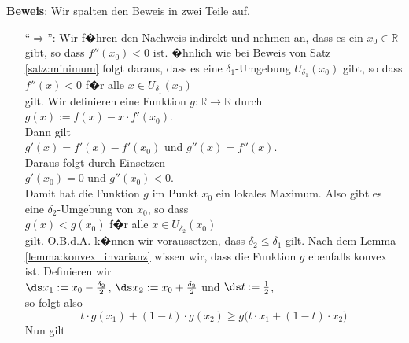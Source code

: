 \noindent
\textbf{Beweis}: Wir spalten den Beweis in zwei Teile auf.
\begin{enumerate}
\item[``$\Rightarrow$'':] Wir f�hren den Nachweis indirekt und nehmen an, dass es ein $x_0 \in \mathbb{R}$
  gibt, so dass $f''(x_0) < 0$ ist.  �hnlich wie bei Beweis von Satz \ref{satz:minimum} folgt daraus, dass
  es eine $\delta_1$-Umgebung $U_{\delta_1}(x_0)$ gibt, so dass
  \\[0.2cm]
  \hspace*{1.3cm} $f''(x) < 0$ \quad f�r alle $x \in U_{\delta_1}(x_0)$ 
  \\[0.2cm]
  gilt.  Wir definieren eine Funktion $g:\mathbb{R} \rightarrow \mathbb{R}$ durch
  \\[0.2cm]
  \hspace*{1.3cm}
  $g(x) := f(x) - x \cdot f'(x_0)$.
  \\[0.2cm]
  Dann gilt 
  \\[0.2cm]
  \hspace*{1.3cm}
  $g'(x) = f'(x) - f'(x_0)$ \quad und \quad $g''(x) = f''(x)$.
  \\[0.2cm]
  Daraus folgt durch Einsetzen
  \\[0.2cm]
  \hspace*{1.3cm}
  $g'(x_0) = 0$ \quad und \quad $g''(x_0) < 0$.
  \\[0.2cm]
  Damit hat die Funktion $g$ im Punkt $x_0$ ein lokales Maximum.  Also gibt es eine $\delta_2$-Umgebung von
  $x_0$, so dass
  \\[0.2cm]
  \hspace*{1.3cm}
  $g(x) < g(x_0)$ \quad f�r alle $x \in U_{\delta_2}(x_0)$
  \\[0.2cm]
  gilt.  O.B.d.A. k�nnen wir voraussetzen, dass $\delta_2 \leq \delta_1$ gilt.  
  Nach dem Lemma \ref{lemma:konvex_invarianz} wissen wir, dass die Funktion $g$ ebenfalls konvex ist.
  Definieren wir
\\[0.2cm]
\hspace*{1.3cm}
 $\ds x_1 := x_0 - \frac{\delta_2}{2}$, \quad $\ds x_2 := x_0 + \frac{\delta_2}{2}$ \quad und \quad $\ds t := \frac{1}{2}$,
\\[0.2cm]
  so folgt also
  \begin{equation}
    \label{eq:konvex1}
  t \cdot g(x_1) + (1 - t) \cdot g(x_2) \geq g\bigl(t \cdot x_1 + (1-t) \cdot x_2\bigr)    
  \end{equation}
  Nun gilt 
  \\[0.2cm]
  \hspace*{1.3cm}

\end{enumerate}

